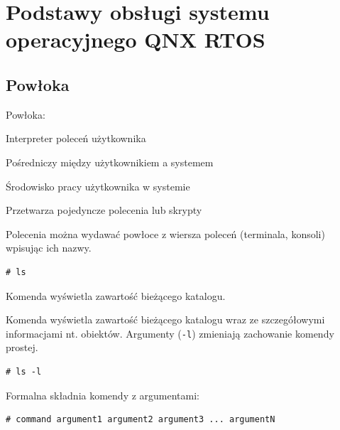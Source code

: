 \section{Podstawy obsługi systemu operacyjnego QNX RTOS}

\subsection{Powłoka}

Powłoka:

\begin{myitemize}
\item Interpreter poleceń użytkownika
\item Pośredniczy między użytkownikiem a systemem
\item Środowisko pracy użytkownika w systemie
\item Przetwarza pojedyncze polecenia lub skrypty
\end{myitemize}


\begin{example} \label{ex:prostakomenda}

Polecenia można wydawać powłoce z wiersza poleceń (terminala, konsoli) wpisując ich nazwy.

\begin{lstlisting}[style=MyBashStyle]
# ls
\end{lstlisting}

Komenda wyświetla zawartość bieżącego katalogu.
\end{example}

\begin{example}\label{ex:prostakomenda2}

Komenda wyświetla zawartość bieżącego katalogu wraz ze szczegółowymi informacjami nt. obiektów. Argumenty (\lstinline[style=MyBashStyle]{-l}) zmieniają zachowanie komendy prostej.

\begin{lstlisting}[style=MyBashStyle]
# ls -l
\end{lstlisting}


Formalna składnia komendy z argumentami:

\begin{lstlisting}[style=MyBashStyle]
# command argument1 argument2 argument3 ... argumentN
\end{lstlisting}
\end{example}

